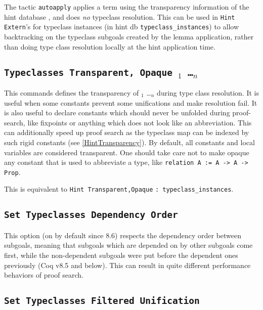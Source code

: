 
The tactic {\tt autoapply} applies a term using the transparency
information of the hint database {\ident}, and does \emph{no} typeclass
resolution. This can be used in {\tt Hint Extern}'s for typeclass
instances (in hint db {\tt typeclass\_instances}) to
allow backtracking on the typeclass subgoals created by the lemma
application, rather than doing type class resolution locally at the hint
application time.

\subsection{\tt Typeclasses Transparent, Opaque {\ident$_1$ \ldots \ident$_n$}}
\label{TypeclassesTransparency}

This commands defines the transparency of {\ident$_1$ \ldots \ident$_n$} 
during type class resolution. It is useful when some constants prevent some
unifications and make resolution fail. It is also useful to declare
constants which should never be unfolded during proof-search, like
fixpoints or anything which does not look like an abbreviation. This can
additionally speed up proof search as the typeclass map can be indexed
by such rigid constants (see \ref{HintTransparency}).
By default, all constants and local variables are considered transparent.
One should take care not to make opaque any constant that is used to
abbreviate a type, like {\tt relation A := A -> A -> Prop}.

This is equivalent to {\tt Hint Transparent,Opaque} {\ident} {\tt: typeclass\_instances}.

\subsection{\tt Set Typeclasses Dependency Order}

This option (on by default since 8.6) respects the dependency order between
subgoals, meaning that subgoals which are depended on by other subgoals 
come first, while the non-dependent subgoals were put before the
dependent ones previously (Coq v8.5 and below). This can result in quite
different performance behaviors of proof search.

\subsection{\tt Set Typeclasses Filtered Unification}


